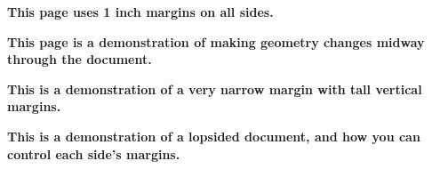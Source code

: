 \documentclass{article}%
\begin{document}

        \textbf{This page uses 1 inch margins on all sides.}\\
        \blindtext[7]
\newpage


        \textbf{This page is a demonstration of making geometry changes midway through the document.} \\
        \blindtext[3]
\newpage


        \textbf{This is a demonstration of a very narrow margin with tall vertical margins.} \\
        \blindtext[3]
\newpage

        \textbf{This is a demonstration of a lopsided document, and how you can control each side's margins.} \\ 
        \blindtext[5]
\end{document}
